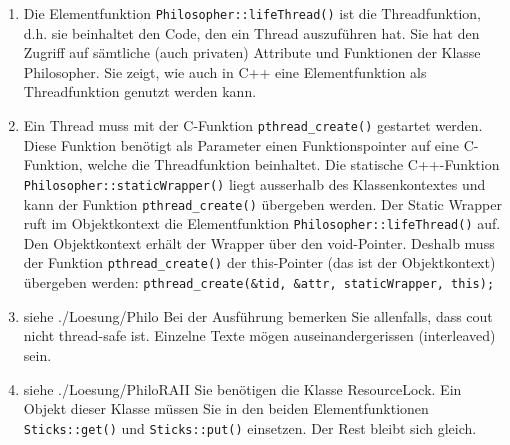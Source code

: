 \begin{enumerate}
  \item Die Elementfunktion \texttt{Philosopher::lifeThread()} ist die Threadfunktion, d.h. sie beinhaltet den Code, den ein Thread auszuführen hat. Sie hat den Zugriff auf sämtliche (auch privaten) Attribute und Funktionen der Klasse Philosopher. Sie zeigt, wie auch in C++ eine Elementfunktion als Threadfunktion genutzt werden kann.
  \item Ein Thread muss mit der C-Funktion \texttt{pthread\_create()} gestartet werden. Diese Funktion benötigt als Parameter einen Funktionspointer auf eine C-Funktion, welche die Threadfunktion beinhaltet. Die statische C++-Funktion \texttt{Philosopher::staticWrapper()} liegt ausserhalb des Klassenkontextes und kann der Funktion \texttt{pthread\_create()} übergeben werden. Der Static Wrapper ruft im Objektkontext die Elementfunktion \texttt{Philosopher::lifeThread()} auf. Den Objektkontext erhält der Wrapper über den void-Pointer. Deshalb muss der Funktion \texttt{pthread\_create()} der this-Pointer (das ist der Objektkontext) übergeben werden: \texttt{pthread\_create(\&tid, \&attr, staticWrapper, this);}
  \item siehe ./Loesung/Philo Bei der Ausführung bemerken Sie allenfalls, dass cout nicht thread-safe ist. Einzelne Texte mögen auseinandergerissen (interleaved) sein.


\noindent\makebox[\linewidth]{\rule{\paperwidth}{0.4pt}}

\noindent\makebox[\linewidth]{\rule{\paperwidth}{0.4pt}}

\noindent\makebox[\linewidth]{\rule{\paperwidth}{0.4pt}}

\noindent\makebox[\linewidth]{\rule{\paperwidth}{0.4pt}}


  \item siehe ./Loesung/PhiloRAII Sie benötigen die Klasse ResourceLock. Ein Objekt dieser Klasse müssen Sie in den beiden Elementfunktionen \texttt{Sticks::get()} und \texttt{Sticks::put()} einsetzen. Der Rest bleibt sich gleich.
\end{enumerate}


